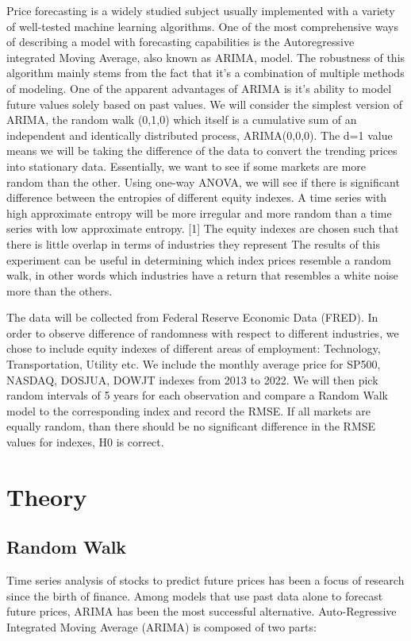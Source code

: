 \documentclass{article}[12pt]
\begin{document}
        Price forecasting is a widely studied subject usually implemented with a variety of well-tested machine learning algorithms. One of the most comprehensive ways of describing a model with forecasting capabilities is the Autoregressive integrated Moving Average, also known as ARIMA, model. The robustness of this algorithm mainly stems from the fact that it's a combination of multiple methods of modeling. One of the apparent advantages of ARIMA is it's ability to model future values solely based on past values. We will consider the simplest version of ARIMA, the random walk (0,1,0) which itself is a cumulative sum of an independent and identically distributed process, ARIMA(0,0,0). The d=1 value means we will be taking the difference of the data to convert the trending prices into stationary data. Essentially, we want to see if some markets are more random than the other. Using one-way ANOVA, we will see if there is significant difference between the entropies of different equity indexes. A time series with high approximate entropy will be more irregular and more random than a time series with low approximate entropy. [1] The equity indexes are chosen such that there is little overlap in terms of industries they represent The results of this experiment can be useful in determining which index prices resemble a random walk, in other words which industries have a return that resembles a white noise more than the others.

        The data will be collected from Federal Reserve Economic Data (FRED). In order to observe difference of randomness with respect to different industries, we chose to include equity indexes of different areas of employment: Technology, Transportation, Utility etc. We include the monthly average price for SP500, NASDAQ, DOSJUA, DOWJT indexes from 2013 to 2022. We will then pick random intervals of 5 years for each observation and compare a Random Walk model to the corresponding index and record the RMSE. If all markets are equally random, than there should be no significant difference in the RMSE values for indexes, H0 is correct.
        
        \section{Theory}
        \subsection{Random Walk}
        Time series analysis of stocks to predict future prices has been a focus of research since the birth of finance. Among models that use past data alone to forecast future prices, ARIMA has been the most successful alternative. Auto-Regressive Integrated Moving Average (ARIMA) is composed of two parts:
\end{document}
